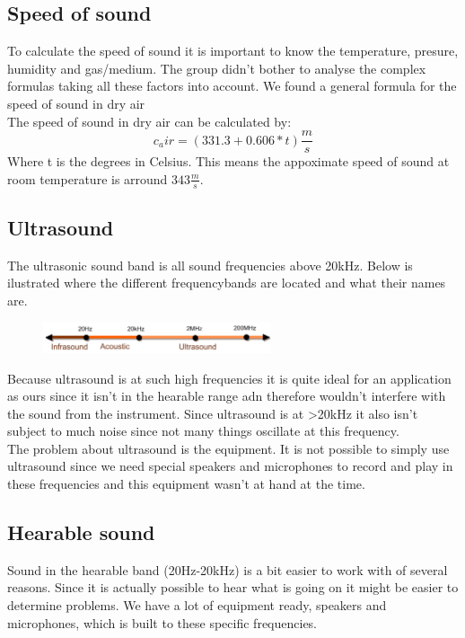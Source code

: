 \subsection{Speed of sound}
To calculate the speed of sound it is important to know the temperature, presure, humidity and gas/medium. The group didn't bother to analyse the complex formulas taking all these factors into account. We found a general formula for the speed of sound in dry air\\
The speed of sound in dry air can be calculated by:
\begin{equation}
c_air=(331.3+0.606*t)\frac{m}{s}
\end{equation}
Where t is the degrees in Celsius. This means the appoximate speed of sound at room temperature is arround $343\frac{m}{s}$.\\
\subsection{Ultrasound}
The ultrasonic sound band is all sound frequencies above 20kHz. Below is ilustrated where the different frequencybands are located and what their names are.
\begin{figure}[H]
\centering
\includegraphics[width=0.6\textwidth]{billeder/frequencybands.png}
\end{figure}
Because ultrasound is at such high frequencies it is quite ideal for an application as ours since it isn't in the hearable range adn therefore wouldn't interfere with the sound from the instrument. Since ultrasound is at >20kHz it also isn't subject to much noise since not many things oscillate at this frequency.\\
The problem about ultrasound is the equipment. It is not possible to simply use ultrasound since we need special speakers and microphones to record and play in these frequencies and this equipment wasn't at hand at the time.
\subsection{Hearable sound}
Sound in the hearable band (20Hz-20kHz) is a bit easier to work with of several reasons. Since it is actually possible to hear what is going on it might be easier to determine problems. We have a lot of equipment ready, speakers and microphones, which is built to these specific frequencies.